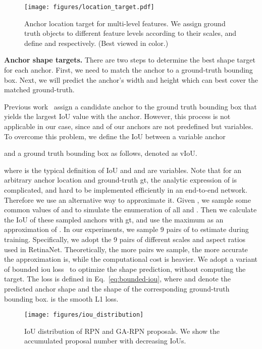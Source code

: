 \documentclass[10pt,twocolumn,letterpaper]{article}
\begin{document}
\begin{figure}[t]
	\centering
	\texttt{[image: figures/location\_target.pdf]}
	\caption{\small{Anchor location target for multi-level features. We assign ground
		truth objects to different feature levels according to their scales, and
		define  and  respectively. (Best viewed in color.)}}
	\label{fig:location-target}
	\vspace{-15pt}
\end{figure}

\noindent
\textbf{Anchor shape targets.}
There are two steps to determine the best shape target for each anchor.
First, we need to match the anchor to a ground-truth bounding box.
Next, we will predict the anchor's width and height which can
best cover the matched ground-truth.

Previous work~\cite{ren2015faster} assign a candidate anchor to the ground
truth bounding box that yields the largest IoU value with the anchor.
However, this process is not applicable in our case, since  and 
of our anchors are not predefined but variables.
To overcome this problem, we define the IoU between a variable anchor

and a ground truth bounding box  as follows,
denoted as vIoU.

where  is the typical definition of IoU and  and 
are variables.
Note that for an arbitrary anchor location  and ground-truth gt,
the analytic expression of  is complicated,
and hard to be implemented efficiently in an end-to-end network.
Therefore we use an alternative way to approximate it. Given ,
we sample some common values of  and  to simulate the enumeration of
all  and . Then we calculate the IoU of these sampled anchors with gt,
and use the maximum as an approximation of .
In our experiments, we sample 9 pairs of  to estimate 
during training.
Specifically, we adopt the 9 pairs of different scales and aspect ratios used
in RetinaNet\cite{lin2017focal}.
Theoretically, the more pairs we sample, the more accurate the approximation is,
while the computational cost is heavier.
We adopt a variant of bounded iou loss~\cite{tychsen2018improving} to optimize
the shape prediction, without computing the target.
The loss is defined in Eq.~\eqref{eq:bounded-iou}, where  and
 denote the predicted anchor shape and the shape
of the corresponding ground-truth bounding box.  is the smooth L1 loss.


\begin{figure}[t]
	\centering
	\texttt{[image: figures/iou\_distribution]}
	\caption{\small{IoU distribution of RPN and GA-RPN proposals. We show the
		accumulated proposal number with decreasing IoUs.}}
	\label{fig:iou-distribution}
	\vspace{-15pt}
\end{figure}
\end{document}
